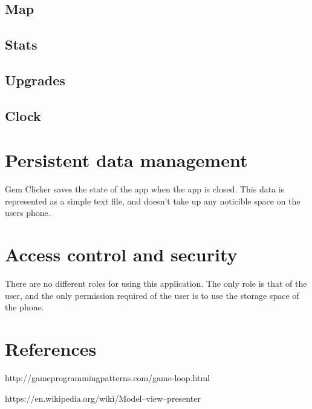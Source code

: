 \documentclass{article}
\begin{document}
\subsection{Map}

\subsection{Stats}

\subsection{Upgrades}

\subsection{Clock}

\section{Persistent data management}
Gem Clicker saves the state of the app when the app is closed. 
This data is represented as a simple text file, and doesn't take up any noticible space on the users phone.

\section{Access control and security}
There are no different roles for using this application. The only role is that of the user,
and the only permission required of the user is to use the storage space of the phone.

\section{References}
\begin{thebibliography}{9}
    
        http://gameprogrammingpatterns.com/game-loop.html
    
        https://en.wikipedia.org/wiki/Model–view–presenter

\end{thebibliography}
\end{document}
